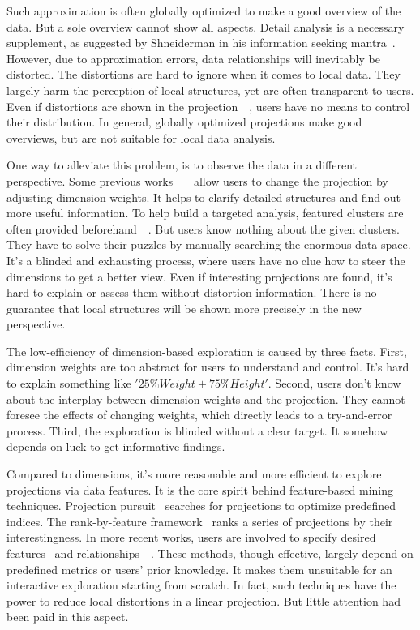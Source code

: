 {Such approximation is often globally optimized to make a good overview of the data. But a sole overview cannot show all aspects. Detail analysis is a necessary supplement, as suggested by Shneiderman in his information seeking mantra~\cite{DBLP:conf/vl/Shneiderman96}. However, due to approximation errors, data relationships will inevitably be distorted. The distortions are hard to ignore when it comes to local data. They largely harm the perception of local structures, yet are often transparent to users. Even if distortions are shown in the projection~\cite{DBLP:journals/tvcg/StahnkeDMT16}~\cite{DBLP:journals/ijon/Aupetit07}, users have no means to control their distribution. In general, globally optimized projections make good overviews, but are not suitable for local data analysis.

One way to alleviate this problem, is to observe the data in a different perspective. Some previous works~\cite{DBLP:journals/cgf/JeongZFRC09}~\cite{DBLP:journals/tvcg/NamM13}~\cite{DBLP:journals/tvcg/LehmannT13} allow users to change the projection by adjusting dimension weights. It helps to clarify detailed structures and find out more useful information. To help build a targeted analysis, featured clusters are often provided beforehand~\cite{DBLP:journals/tvcg/NamM13}~\cite{DBLP:journals/cgf/LiuWTBP15}. But users know nothing about the given clusters. They have to solve their puzzles by manually searching the enormous data space. It's a blinded and exhausting process, where users have no clue how to steer the dimensions to get a better view. Even if interesting projections are found, it's hard to explain or assess them without distortion information. There is no guarantee that local structures will be shown more precisely in the new perspective.

The low-efficiency of dimension-based exploration is caused by three facts. First, dimension weights are too abstract for users to understand and control. It's hard to explain something like $'25\% Weight + 75\% Height'$. Second, users don't know about the interplay between dimension weights and the projection. They cannot foresee the effects of changing weights, which directly leads to a try-and-error process. Third, the exploration is blinded without a clear target. It somehow depends on luck to get informative findings.

Compared to dimensions, it's more reasonable and more efficient to explore projections via data features. It is the core spirit behind feature-based mining techniques. Projection pursuit~\cite{DBLP:journals/tc/FriedmanT74} searches for projections to optimize predefined indices. The rank-by-feature framework~\cite{DBLP:journals/ivs/SeoS05} ranks a series of projections by their interestingness. In more recent works, users are involved to specify desired features~\cite{DBLP:journals/tvcg/JohanssonJ09} and relationships~\cite{DBLP:journals/tvcg/HuBMHNL13}~\cite{DBLP:journals/tvcg/Gleicher13}. These methods, though effective, largely depend on predefined metrics or users' prior knowledge. It makes them unsuitable for an interactive exploration starting from scratch. In fact, such techniques have the power to reduce local distortions in a linear projection. But little attention had been paid in this aspect.

}
